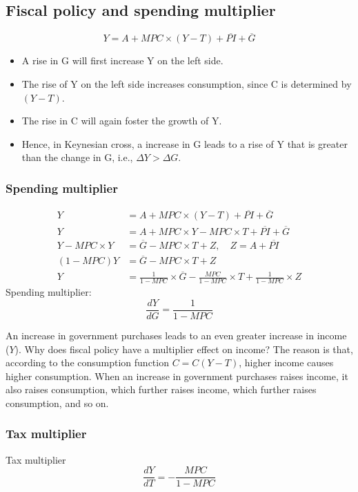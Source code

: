 \documentclass[10pt]{article}
\begin{document}
\subsection{Fiscal policy and spending multiplier}
\begin{equation*}
		Y = A + MPC  \times (Y - T) +  \overline{PI} +  \overline{G}  
\end{equation*}
\begin{itemize}
\item A rise in G will first increase Y on the left side.
\item The rise of Y on the left side increases consumption, since C is determined by
		$ (Y - T) $.
\item The rise in C will again foster the growth of Y.
\item Hence, in Keynesian cross, a increase in G leads to a rise of Y that is greater
		than the change in G, i.e., $ \Delta Y > \Delta G $.
\end{itemize}


\subsubsection{Spending multiplier}
\begin{align*}
		Y &= A + MPC  \times (Y - T) +  \overline{PI} +  \overline{G}  \\
		Y &= A + MPC  \times Y  - MPC  \times  T +  \overline{PI} +  \overline{G}  \\
		Y  -  MPC  \times Y &=  \overline{G}  - MPC  \times T + Z, \quad Z = A +  \overline{PI}\\
		(1 - MPC)Y &=  \overline{G} - MPC  \times T + Z\\
		Y&= \frac{1}{1 - MPC}   \times \overline{G} - \frac{MPC}{1 - MPC} \times T + 
		\frac{1}{1 - MPC} \times  Z
\end{align*}
Spending multiplier:
\begin{equation*}
\frac{dY}{dG} = \frac{1}{1 - MPC}
\end{equation*}

An increase in government purchases leads to an even greater increase in income ($ Y $).
Why does fiscal policy have a multiplier effect on income? The reason is that, according to the 
consumption function $ C = C(Y - T) $, higher income causes higher consumption. When an 
increase in government purchases raises income, it also raises consumption, which further raises
income, which further raises consumption, and so on.


\subsubsection{Tax multiplier}
Tax multiplier
\begin{equation*}
\frac{dY}{dT} = -\frac{MPC}{1 - MPC}
\end{equation*}
\end{document}
